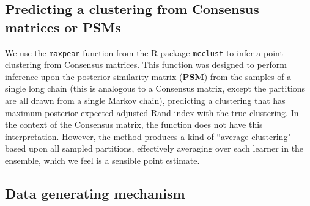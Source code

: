 \documentclass{bioinfo}
\begin{document}
\subsection{Predicting a clustering from Consensus matrices or PSMs}
We use the \texttt{maxpear} function \citep{fritsch2009improved} from the R package \texttt{mcclust} \citep{fritsch2012mcclust} to infer a point clustering from Consensus matrices. This function was designed to perform inference upon the posterior similarity matrix (\textbf{PSM}) from the samples of a single long chain (this is analogous to a Consensus matrix, except the partitions are all drawn from a single Markov chain), predicting a clustering that has maximum posterior expected adjusted Rand index \citep[\textbf{ARI},][]{hubert1985comparing} with the true clustering. In the context of the Consensus matrix, the function does not have this interpretation. However, the method produces a kind of ``average clustering" based upon all sampled partitions, effectively averaging over each learner in the ensemble, which we feel is a sensible point estimate.

\subsection{Data generating mechanism}
%
\end{document}
